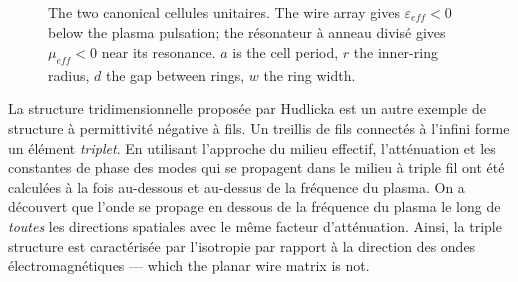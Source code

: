 \begin{figure}[h!]
  \centering
  \caption*{\small The two canonical cellules unitaires.
  The wire array gives $\varepsilon_{\mathit{eff}} < 0$ below the plasma
  pulsation; the résonateur à anneau divisé gives $\mu_{\mathit{eff}} < 0$ near
  its resonance.
  $a$ is the cell period, $r$ the inner-ring radius, $d$ the gap between rings,
  $w$ the ring width.}
\end{figure}

La structure tridimensionnelle proposée par Hudlicka est un autre exemple de
structure à permittivité négative à fils. Un treillis de fils connectés à
l'infini forme un élément \emph{triplet}. En utilisant l'approche du milieu
effectif, l'atténuation et les constantes de phase des modes qui se propagent
dans le milieu à triple fil ont été calculées à la fois au-dessous et au-dessus
de la fréquence du plasma. On a découvert que l'onde se propage en dessous de la
fréquence du plasma le long de \emph{toutes} les directions spatiales avec le
même facteur d'atténuation. Ainsi, la triple structure est caractérisée par
l'isotropie par rapport à la direction des ondes électromagnétiques --- which
the planar wire matrix is not.

